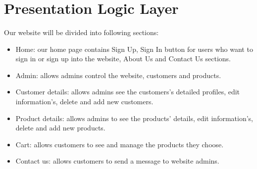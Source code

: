 \section{Presentation Logic Layer}
%

\bigskip
\paragraph{} 
Our website will be divided into following sections:  
\begin{itemize}
    \item Home: our home page contains Sign Up, Sign In button for users who want to sign in or sign up into the website, About Us and Contact Us sections.
    \item Admin: allows admins control the website, customers and products. 
    \item Customer details: allows admins see the customers's detailed profiles, edit information's, delete and add new customers.  
    \item Product details: allows admins to see the products' details, edit information's, delete and add new products. 
    \item Cart: allows customers to see and manage the products they choose. 	
    \item Contact us: allows customers to send a message to website admins. 
\end{itemize}


